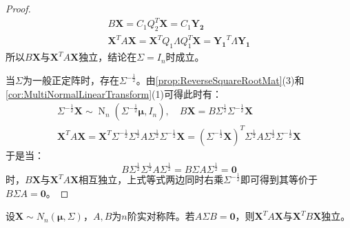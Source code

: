 \begin{proof}
\begin{gather*}
		B\mathbf{X}=C_1Q_2^T\mathbf{X}=C_1\mathbf{Y_2} \\
		\mathbf{X}^TA\mathbf{X}=\mathbf{X}^TQ_1\varLambda Q_1^T\mathbf{X}=\mathbf{Y_1}^T\varLambda\mathbf{Y_1}
	\end{gather*}
	所以$B\mathbf{X}$与$\mathbf{X}^TA\mathbf{X}$独立，结论在$\Sigma=I_n$时成立。\par
	当$\Sigma$为一般正定阵时，存在$\Sigma^{-\frac{1}{2}}$。由\cref{prop:ReverseSquareRootMat}(3)和\cref{cor:MultiNormalLinearTransform}(1)可得此时有：
	\begin{gather*}
		\Sigma^{-\frac{1}{2}}\mathbf{X}\sim\operatorname{N}_n(\Sigma^{-\frac{1}{2}}\boldsymbol{\mu},I_n),\quad B\mathbf{X}=B\Sigma^{\frac{1}{2}}\Sigma^{-\frac{1}{2}}\mathbf{X} \\
		\mathbf{X}^TA\mathbf{X}=\mathbf{X}^T\Sigma^{-\frac{1}{2}}\Sigma^{\frac{1}{2}}A\Sigma^{\frac{1}{2}}\Sigma^{-\frac{1}{2}}\mathbf{X}=(\Sigma^{-\frac{1}{2}}\mathbf{X})^T\Sigma^{\frac{1}{2}}A\Sigma^{\frac{1}{2}}\Sigma^{-\frac{1}{2}}\mathbf{X}
	\end{gather*}
	于是当：
	\begin{equation*}
		B\Sigma^{\frac{1}{2}}\Sigma^{\frac{1}{2}}A\Sigma^{\frac{1}{2}}=B\Sigma A\Sigma^{\frac{1}{2}}=\mathbf{0}
	\end{equation*}
	时，$B\mathbf{X}$与$\mathbf{X}^TA\mathbf{X}$相互独立，上式等式两边同时右乘$\Sigma^{-\frac{1}{2}}$即可得到其等价于$B\Sigma A=\mathbf{0}$。
\end{proof}
\begin{theorem}\label{theo:XAXXBXIndependent}
	设$\mathbf{X}\sim N_n(\boldsymbol{\mu},\Sigma)$，$A,B$为$n$阶实对称阵。若$A\Sigma B=\mathbf{0}$，则$\mathbf{X}^TA\mathbf{X}$与$\mathbf{X}^TB\mathbf{X}$独立。
\end{theorem}
